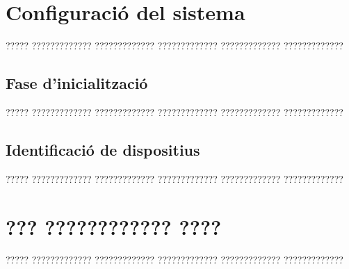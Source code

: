 \documentclass[11pt,spanish,listoffigures,listoftables]{tfgetsinf}
\begin{document}
\APPENDIX


\chapter{Configuració del sistema}

????? ????????????? ????????????? ????????????? ????????????? ?????????????

\section{Fase d'inicialització}

????? ????????????? ????????????? ????????????? ????????????? ?????????????

\section{Identificació de dispositius}

????? ????????????? ????????????? ????????????? ????????????? ?????????????



\chapter{??? ???????????? ????}

????? ????????????? ????????????? ????????????? ????????????? ????????????? 



\end{document}
